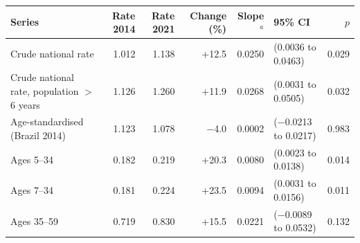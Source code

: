 \begin{tabular}{lrrrrlr}
\toprule
Series & Rate 2014 & Rate 2021 & Change (\%) & Slope$^{a}$ & 95\% CI & $p$ \\
\midrule
Crude national rate & 1.012 & 1.138 & +12.5 & 0.0250 & (0.0036 to 0.0463) & 0.029 \\
Crude national rate, population $>$6 years & 1.126 & 1.260 & +11.9 & 0.0268 & (0.0031 to 0.0505) & 0.032 \\
Age-standardised (Brazil 2014) & 1.123 & 1.078 & $-$4.0 & 0.0002 & ($-$0.0213 to 0.0217) & 0.983 \\
Ages 5--34 & 0.182 & 0.219 & +20.3 & 0.0080 & (0.0023 to 0.0138) & 0.014 \\
Ages 7--34 & 0.181 & 0.224 & +23.5 & 0.0094 & (0.0031 to 0.0156) & 0.011 \\
Ages 35--59 & 0.719 & 0.830 & +15.5 & 0.0221 & ($-$0.0089 to 0.0532) & 0.132 \\
\bottomrule
\end{tabular}
